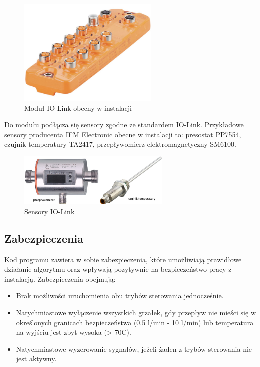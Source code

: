 \documentclass[a4paper,twoside,12pt]{book}
\begin{document}
\begin{figure}[h]
	\centering
	\includegraphics[width=0.6\textwidth]{./img/IOLink.png}
	\caption{Moduł IO-Link obecny w instalacji \cite{ifm}}
	\label{fig:Moduł IO-Link}
\end{figure}

\noindent Do modułu podłącza się sensory zgodne ze standardem IO-Link. Przykładowe sensory producenta IFM Electronic obecne w instalacji to: presostat PP7554, czujnik temperatury TA2417, przepływomierz elektromagnetyczny SM6100.

\begin{figure}[h]
	\centering
	\includegraphics[width=0.65\textwidth]{./img/sensory.png}
	\caption{Sensory IO-Link \cite{ifm}}
	\label{fig:Sensory IO-Link}
\end{figure}

\newpage
\subsection{Zabezpieczenia}
Kod programu zawiera w sobie zabezpieczenia, które umożliwiają prawidłowe działanie algorytmu oraz wpływają pozytywnie na bezpieczeństwo pracy z instalacją. Zabezpieczenia obejmują:
\begin{itemize}
	\item Brak możliwości uruchomienia obu trybów sterowania jednocześnie.
	\item Natychmiastowe wyłączenie wszystkich grzałek, gdy przepływ nie mieści się w określonych granicach bezpieczeństwa (0.5 l/min - 10 l/min) lub temperatura na wyjściu jest zbyt wysoka (> 70\textdegree{}C).
	\item Natychmiastowe wyzerowanie sygnałów, jeżeli żaden z trybów sterowania nie jest aktywny.
\end{itemize}
\end{document}
